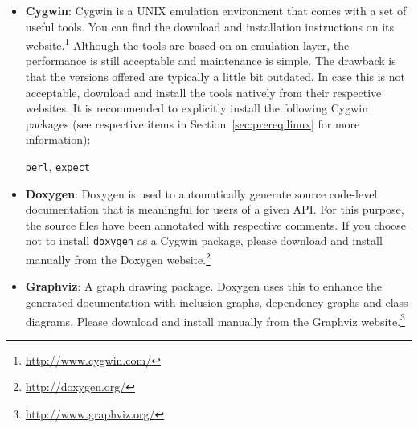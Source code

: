 \begin{itemize}
	\item \textbf{Cygwin}:
		Cygwin is a UNIX emulation environment that comes with a set of useful tools.
		You can find the download and installation instructions on its website.\footnote{\url{http://www.cygwin.com/}}
		Although the tools are based on an emulation layer, the performance is still acceptable and maintenance is simple.
		The drawback is that the versions offered are typically a little bit outdated.
		In case this is not acceptable, download and install the tools natively from their respective websites.
		It is recommended to explicitly install the following Cygwin packages
		(see respective items in Section~\ref{sec:prereq:linux} for more information):
		
		\verb|perl|, \verb|expect|
	
	\item \textbf{Doxygen}:
		Doxygen is used to automatically generate source code-level documentation that is meaningful for users of a given API.
		For this purpose, the \xme source files have been annotated with respective comments.
		If you choose not to install \verb|doxygen| as a Cygwin package,
		please download and install manually from the Doxygen website.\footnote{%
			\url{http://doxygen.org/}
		}
	
	\item \textbf{Graphviz}:
		A graph drawing package.
		Doxygen uses this to enhance the generated documentation with inclusion graphs, dependency graphs and class diagrams.
		Please download and install manually from the Graphviz website.\footnote{%
			\url{http://www.graphviz.org/}
		}
	
\end{itemize}
